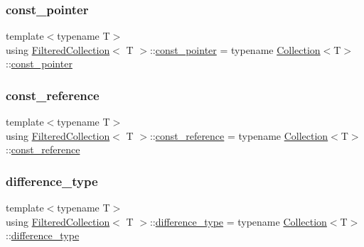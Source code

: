 \mbox{\label{class_filtered_collection_af5e238a7b8ed76c864a2c7526b34a71d}} 
\subsubsection{\texorpdfstring{const\+\_\+pointer}{const\_pointer}}
{\footnotesize\ttfamily template$<$typename T$>$ \\
using \hyperlink{class_filtered_collection}{Filtered\+Collection}$<$ T $>$\+::\hyperlink{class_collection_a79ea96d1fa145e340e907547d0053b81}{const\+\_\+pointer} =  typename \hyperlink{class_collection}{Collection}$<$T$>$\+::\hyperlink{class_collection_a79ea96d1fa145e340e907547d0053b81}{const\+\_\+pointer}}

\mbox{\label{class_filtered_collection_acd1fd308211e928705d0903b749dcaef}} 
\subsubsection{\texorpdfstring{const\+\_\+reference}{const\_reference}}
{\footnotesize\ttfamily template$<$typename T$>$ \\
using \hyperlink{class_filtered_collection}{Filtered\+Collection}$<$ T $>$\+::\hyperlink{class_collection_abb8c0f6de5e322aa531837aab7358b89}{const\+\_\+reference} =  typename \hyperlink{class_collection}{Collection}$<$T$>$\+::\hyperlink{class_collection_abb8c0f6de5e322aa531837aab7358b89}{const\+\_\+reference}}

\mbox{\label{class_filtered_collection_a98c17401762621a928d2b9926d3b71d6}} 
\subsubsection{\texorpdfstring{difference\+\_\+type}{difference\_type}}
{\footnotesize\ttfamily template$<$typename T$>$ \\
using \hyperlink{class_filtered_collection}{Filtered\+Collection}$<$ T $>$\+::\hyperlink{class_collection_a60b36ef7aba0a88dff0e98fc2adb98a8}{difference\+\_\+type} =  typename \hyperlink{class_collection}{Collection}$<$T$>$\+::\hyperlink{class_collection_a60b36ef7aba0a88dff0e98fc2adb98a8}{difference\+\_\+type}}


